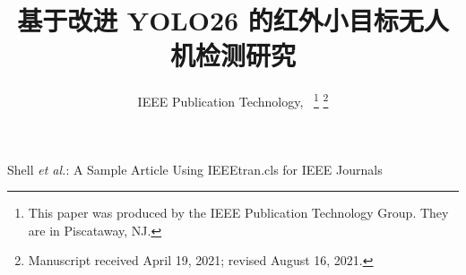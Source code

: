 \documentclass[lettersize,journal]{IEEEtran}
\begin{document}
\title{基于改进 YOLO26 的红外小目标无人机检测研究}

\author{IEEE Publication Technology,~
\thanks{This paper was produced by the IEEE Publication Technology Group. They are in Piscataway, NJ.}%
\thanks{Manuscript received April 19, 2021; revised August 16, 2021.}}

%
{Shell \MakeLowercase{\textit{et al.}}: A Sample Article Using IEEEtran.cls for IEEE Journals}


\maketitle




\end{document}
